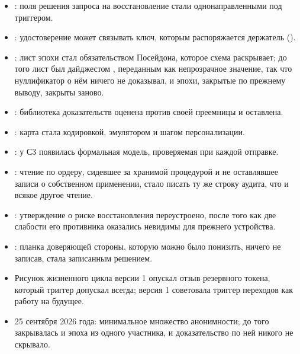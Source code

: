 \begin{itemize}
  \item {}: поля решения запроса на восстановление стали однонаправленными под триггером.
  \item {}: удостоверение может связывать ключ, которым распоряжается держатель
    ().
  \item {}: лист эпохи стал обязательством Посейдона, которое схема раскрывает; до того лист
    был дайджестом , переданным как непрозрачное значение, так что нуллификатор о нём
    ничего не доказывал, и эпохи, закрытые по прежнему выводу, закрыты заново.
  \item {}: библиотека доказательств оценена против своей преемницы и оставлена.
  \item {}: карта стала кодировкой, эмулятором и шагом персонализации.
  \item {}: у С3 появилась формальная модель, проверяемая при каждой отправке.
  \item {}: чтение по ордеру, сидевшее за хранимой процедурой и не оставлявшее записи о
    собственном применении, стало писать ту же строку аудита, что и всякое другое чтение.
  \item {}: утверждение о риске восстановления переустроено, после того как две слабости
    его противника оказались невидимы для прежнего устройства.
  \item {}: планка доверяющей стороны, которую можно было понизить, ничего не записав,
    стала записанным решением.
  \item Рисунок жизненного цикла версии 1 опускал отзыв резервного токена, который триггер допускал
    всегда; версия 1 советовала триггер переходов как работу на будущее.
  \item 25 сентября 2026 года: минимальное множество анонимности; до того закрывалась и эпоха из
    одного участника, и доказательство по ней никого не скрывало.
\end{itemize}

